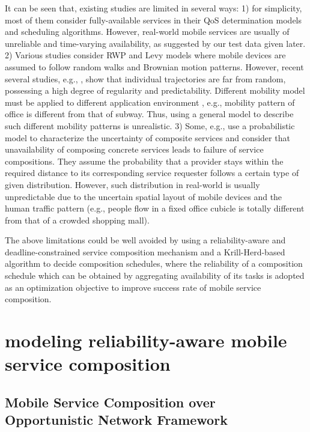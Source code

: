 \documentclass[journal]{IEEEtran}
\begin{document}
It can be seen that, existing studies are limited in several ways: 
1) for simplicity, most of them consider fully-available services in their QoS determination models and scheduling algorithms. However, real-world mobile services are usually of unreliable and time-varying availability, as suggested by our test data given later.
2) Various studies consider RWP and Levy models where mobile devices are assumed to follow random walks and Brownian motion patterns. However, recent several studies, e.g., \cite{barbosa2017human, bettstetter2003node, navidi2004improving}, show that individual trajectories are far from random, possessing a high degree of regularity and predictability. Different mobility model must be applied to different application environment \cite{camp2002survey}, e.g., mobility pattern of office is different from that of subway. Thus, using a general model to describe such different mobility patterns is unrealistic.
3) Some, e.g., \cite{wang2011exploiting, Deng2016-2} use a probabilistic model to characterize the uncertainty of composite services and consider that unavailability of composing concrete services leads to failure of service compositions.
They assume the probability that a provider stays within the required distance to its corresponding service requester follows a certain type of given distribution. However, such distribution in real-world is usually unpredictable due to the uncertain spatial layout of mobile devices and the human traffic pattern (e.g., people flow in a fixed office cubicle is totally different from that of a crowded shopping mall). 

The above limitations could be well avoided by using a reliability-aware and deadline-constrained service composition mechanism and a Krill-Herd-based algorithm to decide composition schedules, where the reliability of a composition schedule which can be obtained by aggregating availability of its tasks is adopted as an optimization objective to improve success rate of mobile service composition.

\section{modeling reliability-aware mobile service composition}

\subsection{Mobile Service Composition over Opportunistic Network Framework}
\end{document}
